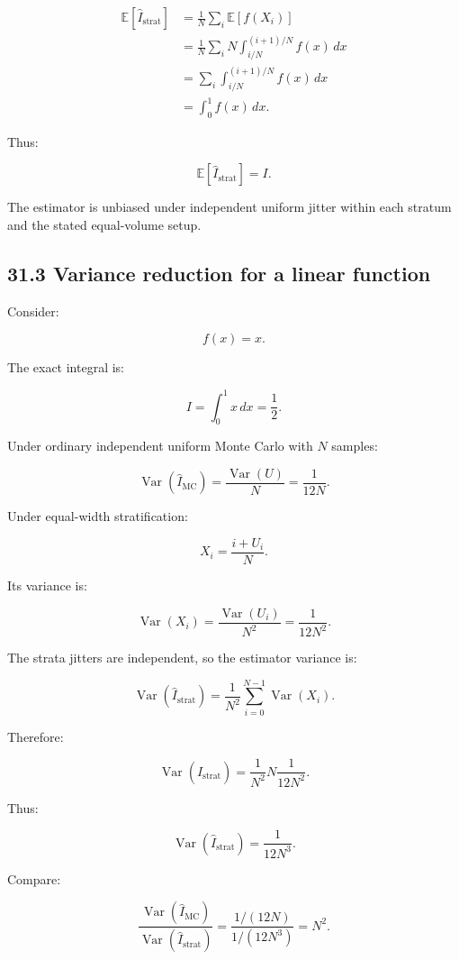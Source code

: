 \[ \begin{aligned} \mathbb E[\widehat I_{\mathrm{strat}}] &= \frac1N\sum_i\mathbb E[f(X_i)]\\ &= \frac1N\sum_i N\int_{i/N}^{(i+1)/N}f(x)\,dx\\ &= \sum_i\int_{i/N}^{(i+1)/N}f(x)\,dx\\ &= \int_0^1f(x)\,dx. \end{aligned} \]

Thus:

\[ \boxed{ \mathbb E[\widehat I_{\mathrm{strat}}]=I }. \]

The estimator is unbiased under independent uniform jitter within each stratum and the stated equal-volume setup.

\subsection{31.3 Variance reduction for a linear function}\label{02-foundations-ii-ch031-variance-reduction-for-a-linear-function}

Consider:

\[ f(x)=x. \]

The exact integral is:

\[ I=\int_0^1x\,dx=\frac12. \]

Under ordinary independent uniform Monte Carlo with \(N\) samples:

\[ \operatorname{Var}(\widehat I_{\mathrm{MC}}) = \frac{\operatorname{Var}(U)}N = \boxed{\frac1{12N}}. \]

Under equal-width stratification:

\[ X_i=\frac{i+U_i}{N}. \]

Its variance is:

\[ \operatorname{Var}(X_i) = \frac{\operatorname{Var}(U_i)}{N^2} = \frac1{12N^2}. \]

The strata jitters are independent, so the estimator variance is:

\[ \operatorname{Var}(\widehat I_{\mathrm{strat}}) = \frac1{N^2} \sum_{i=0}^{N-1}\operatorname{Var}(X_i). \]

Therefore:

\[ \operatorname{Var}(\widehat I_{\mathrm{strat}}) = \frac1{N^2} N\frac1{12N^2}. \]

Thus:

\[ \boxed{ \operatorname{Var}(\widehat I_{\mathrm{strat}}) = \frac1{12N^3} }. \]

Compare:

\[ \frac{ \operatorname{Var}(\widehat I_{\mathrm{MC}}) }{ \operatorname{Var}(\widehat I_{\mathrm{strat}}) } = \frac{1/(12N)}{1/(12N^3)} = \boxed{N^2}. \]


